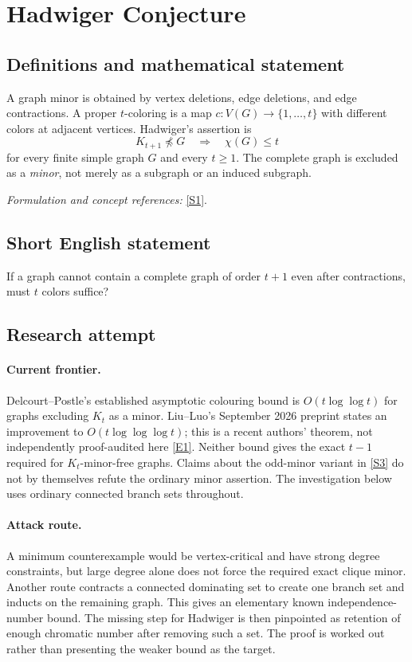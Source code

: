 \documentclass[11pt,a4paper]{article}
\numberwithin{equation}{section}
\newcommand{\sref}[2]{\hyperlink{source:#1:#2}{[S#2]}}
\newcommand{\eref}[2]{\hyperlink{extra:#1:#2}{[E#2]}}
\newif\ifshowcatalogue
\newcommand{\cataloguescope}[1]{\ifshowcatalogue
 \paragraph{Exact scope in the supplied catalogue.}
 \begin{quote}\small #1\end{quote}\fi}
\begin{document}
\setcounter{section}{0}
\section*{\texorpdfstring{Hadwiger Conjecture}{Hadwiger Conjecture}}\label{statement}
\subsection{Definitions and mathematical statement}
A graph minor is obtained by vertex deletions, edge deletions, and edge contractions. A proper $t$-coloring is a map $c:V(G)\to\{1,\ldots,t\}$ with different colors at adjacent vertices. Hadwiger's assertion is
\[
 K_{t+1}\not\preccurlyeq G\quad\Longrightarrow\quad\chi(G)\le t
\]
for every finite simple graph $G$ and every $t\ge1$. The complete graph is excluded as a \emph{minor}, not merely as a subgraph or an induced subgraph.
\par\smallskip\textit{Formulation and concept references:} \sref{statement}{1}.
\cataloguescope{Prove that every simple graph with no K\_\{t+1\} minor is t-colourable for every integer t >= 1.}
\subsection{Short English statement}
If a graph cannot contain a complete graph of order $t+1$ even after contractions, must $t$ colors suffice?
\subsection{Research attempt}

\paragraph{Current frontier.}
Delcourt--Postle's established asymptotic colouring bound is
$O(t\log\log t)$ for graphs excluding $K_t$ as a minor. Liu--Luo's September
2026 preprint states an improvement to $O(t\log\log\log t)$; this is a
recent authors' theorem, not independently proof-audited here
\eref{statement}{1}. Neither bound gives the exact $t-1$ required for $K_t$-minor-free
graphs. Claims about the odd-minor variant in \sref{statement}{3} do not by
themselves refute the ordinary minor assertion. The investigation below
uses ordinary connected branch sets throughout.

\paragraph{Attack route.}
A minimum counterexample would be vertex-critical and have strong degree
constraints, but large degree alone does not force the required exact
clique minor. Another route contracts a connected dominating set to create
one branch set and inducts on the remaining graph. This gives an elementary
known independence-number bound. The missing step for Hadwiger is then
pinpointed as retention of enough chromatic number after removing such a
set. The proof is worked out rather than presenting the weaker bound as
the target.
\end{document}
